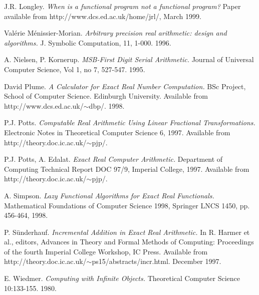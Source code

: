 \documentclass{cs4rep}
\begin{document}
\begin{thebibliography}{20}
 J.R.  Longley. {\em When is a functional program
    not a functional program?}  Paper available from
  http://www.dcs.ed.ac.uk/home/jrl/, March 1999.
  
 Val\'erie M\'enissier-Morian. {\em
    Arbitrary precision real arithmetic: design and algorithms.} J.
  Symbolic Computation, 11, 1-000. 1996.
  
 A. Nielsen, P.  Kornerup.  {\em MSB-First Digit
    Serial Arithmetic.} Journal of Universal Computer Science, Vol 1,
  no 7, 527-547. 1995.
  
 David Plume. {\em A Calculator for Exact Real
    Number Computation.} BSc Project, School of Computer Science.
  Edinburgh University. Available from
  http://www.dcs.ed.ac.uk/$\sim$dbp/. 1998.
  
 P.J. Potts. {\em Computable Real Arithmetic Using
    Linear Fractional Transformations.}  Electronic Notes in
  Theoretical Computer Science 6, 1997.  Available from
  http://theory.doc.ic.ac.uk/$\sim$pjp/.
  
 P.J. Potts, A. Edalat. {\em Exact Real Computer
    Arithmetic.} Department of Computing Technical Report DOC 97/9,
  Imperial College, 1997. Available from
  http://theory.doc.ic.ac.uk/$\sim$pjp/.
  
 A. Simpson. {\em Lazy Functional Algorithms for
    Exact Real Functionals.} Mathematical Foundations of Computer
  Science 1998, Springer LNCS 1450, pp.  456-464, 1998.
  
 P. S\"{u}nderhauf. {\em Incremental Addition
    in Exact Real Arithmetic.} In R. Harmer et al., editors, Advances
  in Theory and Formal Methods of Computing: Proceedings of the fourth
  Imperial College Workshop, IC Press. Available from
  http://theory.doc.ic.ac.uk/$\sim$ps15/abstracts/incr.html.  December
  1997.
  
 E. Wiedmer.  {\em Computing with Infinite
    Objects.} Theoretical Computer Science 10:133-155.  1980.
  
\end{thebibliography}
\end{document}

